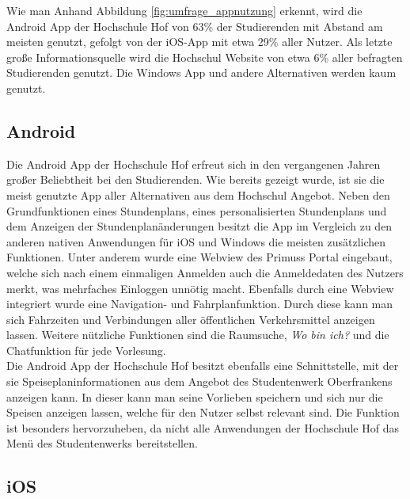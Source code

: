 
Wie man Anhand Abbildung \ref{fig:umfrage_appnutzung} erkennt, wird die Android \ac{App} der Hochschule Hof von 63\% der Studierenden mit Abstand am meisten genutzt, gefolgt von der \ac{iOS}-\ac{App} mit etwa 29\% aller Nutzer. Als letzte große Informationsquelle wird die Hochschul Website von etwa 6\% aller befragten Studierenden genutzt. Die Windows \ac{App} und andere Alternativen werden kaum genutzt. 

\subsection{Android}

Die Android \ac{App} der Hochschule Hof erfreut sich in den vergangenen Jahren großer Beliebtheit bei den Studierenden. Wie bereits gezeigt wurde, ist sie die meist genutzte \ac{App} aller Alternativen aus dem Hochschul Angebot. Neben den Grundfunktionen eines Stundenplans, eines personalisierten Stundenplans und dem Anzeigen der Stundenplanänderungen besitzt die \ac{App} im Vergleich zu den anderen nativen Anwendungen für \ac{iOS} und Windows die meisten zusätzlichen Funktionen. Unter anderem wurde eine Webview des Primuss Portal eingebaut, welche sich nach einem einmaligen Anmelden auch die Anmeldedaten des Nutzers merkt, was mehrfaches Einloggen unnötig macht. Ebenfalls durch eine Webview integriert wurde eine Navigation- und Fahrplanfunktion. Durch diese kann man sich Fahrzeiten und Verbindungen aller öffentlichen Verkehrsmittel anzeigen lassen. Weitere nützliche Funktionen sind die Raumsuche, \textit{Wo bin ich?} und die Chatfunktion für jede Vorlesung.
\\
\linebreak
Die Android \ac{App} der Hochschule Hof besitzt ebenfalls eine Schnittstelle, mit der sie Speiseplaninformationen aus dem Angebot des Studentenwerk Oberfrankens anzeigen kann. In dieser kann man seine Vorlieben speichern und sich nur die Speisen anzeigen lassen, welche für den Nutzer selbst relevant sind. Die Funktion ist besonders hervorzuheben, da nicht alle Anwendungen der Hochschule Hof das Menü des Studentenwerks bereitstellen. 

\subsection{iOS}

